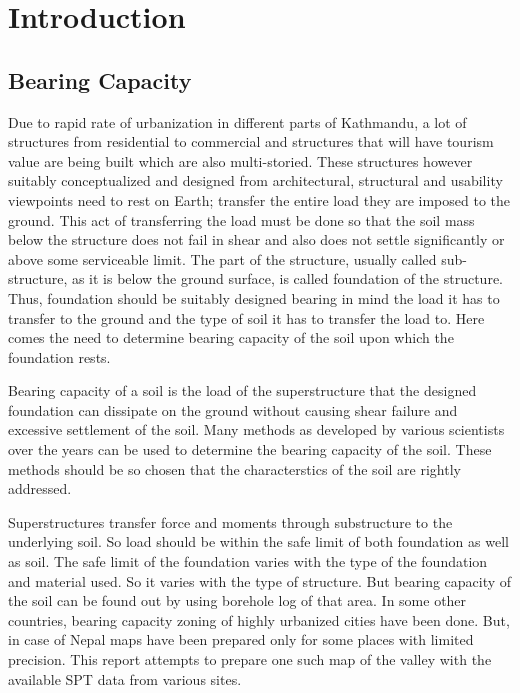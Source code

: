 \chapter{Introduction}
\section{Bearing Capacity}
Due to rapid rate of urbanization in different parts of Kathmandu, a lot of structures from residential to commercial and structures that will have tourism value are being built which are also multi-storied. These structures however suitably conceptualized and designed from architectural, structural and usability viewpoints need to rest on Earth; transfer the entire load they are imposed to the ground. This act of transferring the load must be done so that the soil mass below the structure does not fail in shear and also does not settle significantly or above some serviceable limit. The part of the structure, usually called sub-structure, as it is below the ground surface, is called foundation of the structure. Thus, foundation should be suitably designed bearing in mind the load it has to transfer to the ground and the type of soil it has to transfer the load to. Here comes the need to determine bearing capacity of the soil upon which the foundation rests.

Bearing capacity of a soil is the load of the superstructure that the designed foundation can dissipate on the ground without causing shear failure and excessive settlement of the soil. Many methods as developed by various scientists over the years can be used to determine the bearing capacity of the soil. These methods should be so chosen that the characterstics of the soil are rightly addressed. 

Superstructures transfer force and moments through substructure to the underlying soil. So load should be within the safe limit of both foundation as well as soil. The safe limit of the foundation varies with the type of the foundation and material used. So it varies with the type of structure. But bearing capacity of the soil can be found out by using borehole log of that area. In some other countries, bearing capacity zoning of highly urbanized cities have been done. But, in case of  Nepal maps have been prepared only for some places with limited precision. This report attempts to prepare one such map of the valley with the available SPT data from various sites.

